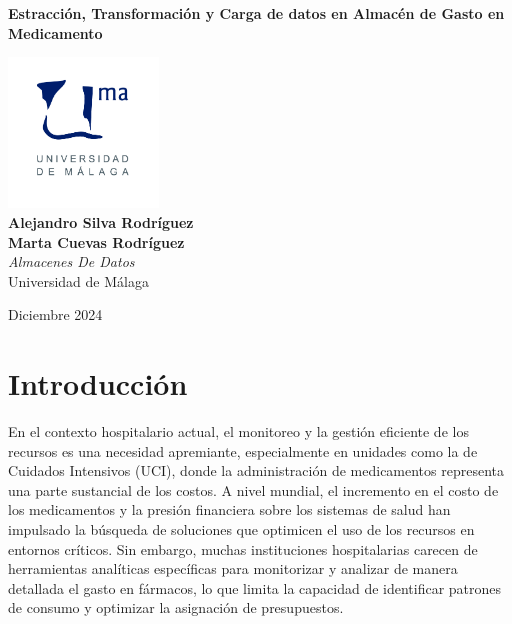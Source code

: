 \documentclass{article}
\begin{document}
	
	
	
	\begin{titlepage}
		\centering
		\vspace*{3cm}
		
		{\Huge \textbf{Estracción, Transformación y Carga de datos en Almacén de Gasto en Medicamento}\\[0.5cm]}
		
		\vspace{2cm}
		\includegraphics[width=0.3\textwidth]{images/uma_logo.jpg}\\[1cm]
		
		{\LARGE \textbf{Alejandro Silva Rodríguez}\\[0.5cm]}
		{\LARGE \textbf{Marta Cuevas Rodríguez}\\[0.5cm]}
		{\large \textit{Almacenes De Datos}\\
			Universidad de Málaga\\
		}
		
		\vfill
		
		{\large Diciembre 2024}
	\end{titlepage}
	
	\tableofcontents
	
	\newpage
	\section{Introducción}
	\label{sec:introduccion}
	
	En el contexto hospitalario actual, el monitoreo y la gestión eficiente de los recursos es una necesidad apremiante, especialmente en unidades como la de Cuidados Intensivos (UCI), donde la administración de medicamentos representa una parte sustancial de los costos. A nivel mundial, el incremento en el costo de los medicamentos y la presión financiera sobre los sistemas de salud han impulsado la búsqueda de soluciones que optimicen el uso de los recursos en entornos críticos. Sin embargo, muchas instituciones hospitalarias carecen de herramientas analíticas específicas para monitorizar y analizar de manera detallada el gasto en fármacos, lo que limita la capacidad de identificar patrones de consumo y optimizar la asignación de presupuestos.\\
	
\end{document}
